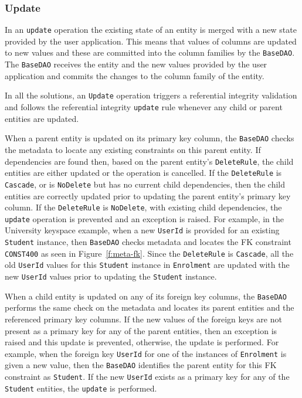 		
		\subsubsection{Update}
		In an \texttt{update} operation the existing state of an entity is merged
		with a new state provided by the user application. 
		This means that  values of columns are updated to new values and these are
		committed into the column families by the \texttt{BaseDAO}.  The
		\texttt{BaseDAO} receives the entity and the new values provided by the user
		application and commits the changes to the column family of the entity. 
		
		In all the solutions, an \texttt{Update} operation triggers a referential
		integrity validation and follows the referential integrity \texttt{update} rule  whenever
		any child or parent entities are updated.  
		
		When a parent entity is updated on its primary key column,  the
		\texttt{BaseDAO} checks the metadata to locate  any existing constraints on
		this parent entity.  If dependencies are found then, based on the parent
		entity's \texttt{DeleteRule}, the child entities are either updated or the
		operation is cancelled.  If the \texttt{DeleteRule}  is \texttt{Cascade}, or
		is \texttt{NoDelete} but has no current child dependencies, then the child 
		entities are correctly updated prior to updating the parent entity's primary
		key column.  If the \texttt{DeleteRule} is \texttt{NoDelete}, with existing
		child dependencies, the \texttt{update} operation is prevented and an
		exception is raised.  For example, in the University keyspace example, when a
		new \texttt{UserId} is provided for an existing  \texttt{Student}
		instance, then \texttt{BaseDAO} checks metadata and locates the \ac{FK} constraint
		\texttt{CONST400} as seen in Figure~\ref{f:meta-fk}.  Since the
		\texttt{DeleteRule} is \texttt{Cascade}, all the old \texttt{UserId} values
		for this \texttt{Student} instance in \texttt{Enrolment} are updated with the new
		\texttt{UserId} values prior to updating the \texttt{Student} instance. 
		
		When a child entity is updated on any of its
		foreign key columns, the \texttt{BaseDAO} performs the same check on the
		metadata and locates its parent entities and the referenced primary key columns. 
		If the new values of the foreign keys are not present as a primary key for any of the
		parent entities, then an exception is raised and this update is prevented,
		otherwise, the update is performed.  For example, when the foreign key
		\texttt{UserId} for one of the instances of \texttt{Enrolment} is given a new
		value, then the \texttt{BaseDAO} identifies the parent entity for this
		\ac{FK} constraint as \texttt{Student}.  If the new
		\texttt{UserId} exists as a primary key for any of the \texttt{Student}
		entities, the \texttt{update} is performed. 
		
